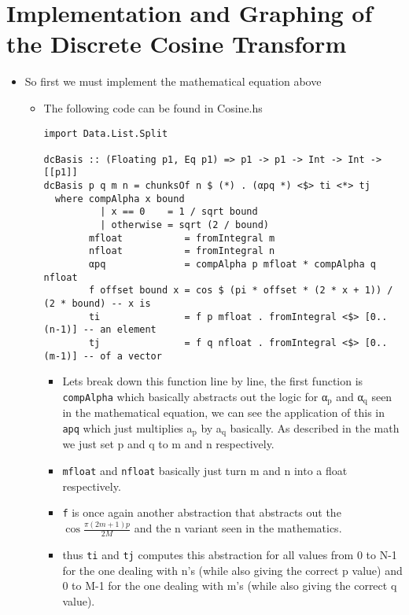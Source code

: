 \documentclass{article}
\begin{document}
\section{Implementation and Graphing of the Discrete Cosine Transform}
\label{sec-2}
\begin{itemize}
\item So first we must implement the mathematical equation above
\begin{itemize}
\item The following code can be found in Cosine.hs
\begin{verbatim}
import Data.List.Split

dcBasis :: (Floating p1, Eq p1) => p1 -> p1 -> Int -> Int -> [[p1]]
dcBasis p q m n = chunksOf n $ (*) . (αpq *) <$> ti <*> tj
  where compAlpha x bound
          | x == 0    = 1 / sqrt bound
          | otherwise = sqrt (2 / bound)
        mfloat           = fromIntegral m
        nfloat           = fromIntegral n
        αpq              = compAlpha p mfloat * compAlpha q nfloat
        f offset bound x = cos $ (pi * offset * (2 * x + 1)) / (2 * bound) -- x is
        ti               = f p mfloat . fromIntegral <$> [0..(n-1)] -- an element
        tj               = f q nfloat . fromIntegral <$> [0..(m-1)] -- of a vector
\end{verbatim}
\begin{itemize}
\item Lets break down this function line by line, the first
function is \texttt{compAlpha} which basically abstracts out the logic
for α$_{\text{p}}$ and α$_{\text{q}}$ seen in the mathematical equation, we can see the
application of this in \texttt{apq} which just multiplies a$_{\text{p}}$ by a$_{\text{q}}$
basically. As described in the math we just set p and q to m and n
respectively.

\item \texttt{mfloat} and \texttt{nfloat} basically just turn m and n into a float
respectively.

\item \texttt{f} is once again another abstraction that abstracts out the
$\cos\frac{π(2m + 1)p}{2M}$ and the n variant seen in the
mathematics.

\item thus \texttt{ti} and \texttt{tj} computes this abstraction for all values from 0
to N-1 for the one dealing with n's (while also giving the
correct p value) and 0 to M-1 for the one dealing with m's (while
also giving the correct q value).


\end{itemize}
\end{itemize}
\end{itemize}
\end{document}
